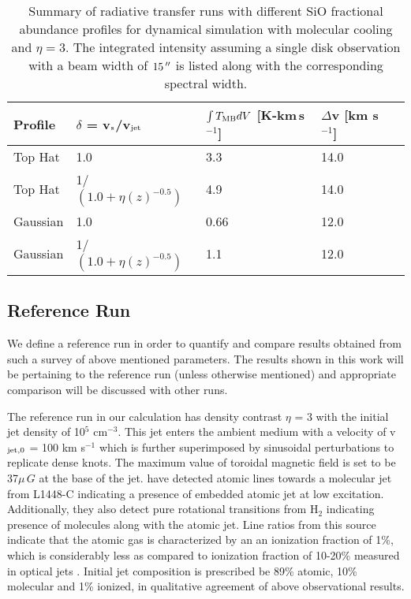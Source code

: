 \documentclass[useAMS,usenatbib]{mn2e}
\begin{document}
 

\begin{table*}
\centering
\caption{Summary of radiative transfer runs with different SiO fractional abundance
  profiles for dynamical simulation with molecular cooling and
  $\eta=3$. The integrated intensity assuming a single disk
  observation with a beam width of $15\,\hbox{$^{\prime\prime}$}$ is listed along with the
  corresponding spectral width.}
\begin{tabular}{l | l | l | l | l}
\hline
Profile & $\delta$ = v$_{\rm s}$/v$_{\rm jet}$ & $\int T_{\rm MB}dV$
[K-km\,s$^{-1}$] & $\Delta$v [km s$^{-1}$]\\ 
\hline\hline
Top Hat & 1.0 & 3.3 & 14.0 \\
Top Hat & 1/$(1.0 + \eta(z)^{-0.5})$ & 4.9 & 14.0 \\
Gaussian & 1.0 & 0.66
& 12.0 \\
Gaussian & 1/$(1.0 + \eta(z)^{-0.5})$ & 1.1
& 12.0 \\
\hline
\end{tabular}
\label{tab:result2}
\end{table*}

\subsection{Reference Run}
\label{ssec:refrun}
We define a reference run in order to quantify and compare results obtained from such a
survey of above mentioned parameters. The results shown in this work will be
pertaining to the reference run (unless otherwise mentioned) and appropriate comparison will be
discussed with other runs. 

The reference run in our calculation has density contrast $\eta$ = 3
with the initial jet density of 10$^{5}$ cm$^{-3}$. This jet enters the
ambient medium with a velocity of v$_{\rm jet,0}$ = 100 km
s$^{-1}$ which is further superimposed by sinusoidal perturbations to
replicate dense knots. The maximum value of toroidal magnetic field is
set to be 37$\mu\,G$ at the base of the jet.
\cite{Dionatos:2009p15670} have detected atomic lines
towards a molecular jet from L1448-C indicating a presence of embedded
atomic jet at low excitation. Additionally, they also detect pure
rotational transitions from H$_{2}$ indicating presence of molecules
along with the atomic jet. Line ratios from this source indicate that the
atomic gas is characterized by an an ionization fraction of 1\%,
which is considerably less as compared to ionization fraction of
10-20\% measured in optical jets \citep{Bacciotti:1995p15970}.
Initial jet composition is prescribed
be 89\% atomic, 10\% molecular and 1\% ionized, in qualitative
agreement of above observational results. 
%
\end{document}
